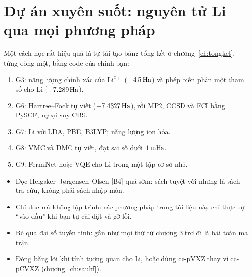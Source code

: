 \section*{Dự án xuyên suốt: nguyên tử Li qua mọi phương pháp}
Một cách học rất hiệu quả là tự tái tạo bảng tổng kết ở chương~\ref{ch:tongket}, từng dòng một, bằng code của chính bạn:
\begin{enumerate}
\item G3: năng lượng chính xác của Li$^{2+}$ ($-4.5\,\mathrm{Ha}$) và phép biến phân một tham số cho Li ($-7.289\,\mathrm{Ha}$).
\item G6: Hartree--Fock tự viết ($-7.4327\,\mathrm{Ha}$), rồi MP2, CCSD và FCI bằng PySCF, ngoại suy CBS.
\item G7: Li với LDA, PBE, B3LYP; năng lượng ion hóa.
\item G8: VMC và DMC tự viết, đạt sai số dưới $1\,\mathrm{mHa}$.
\item G9: FermiNet hoặc VQE cho Li trong một tập cơ sở nhỏ.
\end{enumerate}

\begin{hieulam}
\begin{itemize}
\item Đọc Helgaker--Jørgensen--Olsen [B4] quá sớm: sách tuyệt vời nhưng là sách tra cứu, không phải sách nhập môn.
\item Chỉ đọc mà không lập trình: các phương pháp trong tài liệu này chỉ thực sự ``vào đầu'' khi bạn tự cài đặt và gỡ lỗi.
\item Bỏ qua đại số tuyến tính: gần như mọi thứ từ chương 3 trở đi là bài toán ma trận.
\item Đóng băng lõi khi tính tương quan cho Li, hoặc dùng cc-pVXZ thay vì cc-pCVXZ (chương~\ref{ch:sauhf}).
\end{itemize}
\end{hieulam}
